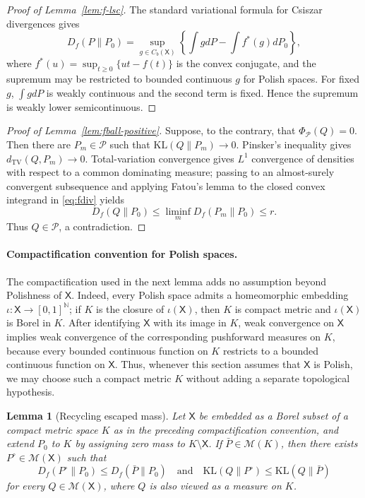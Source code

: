 \documentclass[11pt]{article}
\newcommand{\KL}{\mathrm{KL}}
\newcommand{\Pcal}{\mathcal{P}}
\newcommand{\X}{\mathsf{X}}
\newcommand{\M}{\mathcal{M}}
\newtheorem{lemma}[theorem]{Lemma}
\theoremstyle{definition}
\theoremstyle{definition}
\begin{document}
\begin{proof}[Proof of Lemma~\ref{lem:f-lsc}]
The standard variational formula for Csiszar divergences gives
\[
  D_f(P\|P_0)
  =\sup_{g\in C_b(\X)}\left\{\int gd P-\int f^*(g)d P_0\right\},
\]
where \(f^*(u)=\sup_{t\ge0}\{ut-f(t)\}\) is the convex conjugate, and the supremum may be restricted to bounded continuous \(g\) for Polish spaces.  For fixed \(g\), \(\int gd P\) is weakly continuous and the second term is fixed.  Hence the supremum is weakly lower semicontinuous.
\end{proof}

\begin{proof}[Proof of Lemma~\ref{lem:fball-positive}]
Suppose, to the contrary, that \(\Phi_{\Pcal}(Q)=0\).  Then there are \(P_m\in\Pcal\) such that \(\KL(Q\|P_m)\to0\).  Pinsker's inequality gives \(d_{\mathrm{TV}}(Q,P_m)\to0\).  Total-variation convergence gives \(L^1\) convergence of densities with respect to a common dominating measure; passing to an almost-surely convergent subsequence and applying Fatou's lemma to the closed convex integrand in \eqref{eq:fdiv} yields
\[
  D_f(Q\|P_0)\le\liminf_m D_f(P_m\|P_0)\le r.
\]
Thus \(Q\in\Pcal\), a contradiction.
\end{proof}



\paragraph{Compactification convention for Polish spaces.}
The compactification used in the next lemma adds no assumption beyond Polishness of \(\X\).  Indeed, every Polish space admits a homeomorphic embedding \(\iota:\X\to[0,1]^{\mathbb N}\); if \(K\) is the closure of \(\iota(\X)\), then \(K\) is compact metric and \(\iota(\X)\) is Borel in \(K\).  After identifying \(\X\) with its image in \(K\), weak convergence on \(\X\) implies weak convergence of the corresponding pushforward measures on \(K\), because every bounded continuous function on \(K\) restricts to a bounded continuous function on \(\X\).  Thus, whenever this section assumes that \(\X\) is Polish, we may choose such a compact metric \(K\) without adding a separate topological hypothesis.

\begin{lemma}[Recycling escaped mass]\label{lem:recycle}
Let \(\X\) be embedded as a Borel subset of a compact metric space \(K\) as in the preceding compactification convention, and extend \(P_0\) to \(K\) by assigning zero mass to \(K\setminus\X\).  If \(\bar P\in\M(K)\), then there exists \(P^\circ\in\M(\X)\) such that
\[
  D_f(P^\circ\|P_0)\le D_f(\bar P\|P_0)
  \quad\text{and}\quad
  \KL(Q\|P^\circ)\le\KL(Q\|\bar P)
\]
for every \(Q\in\M(\X)\), where \(Q\) is also viewed as a measure on \(K\).
\end{lemma}
\end{document}
